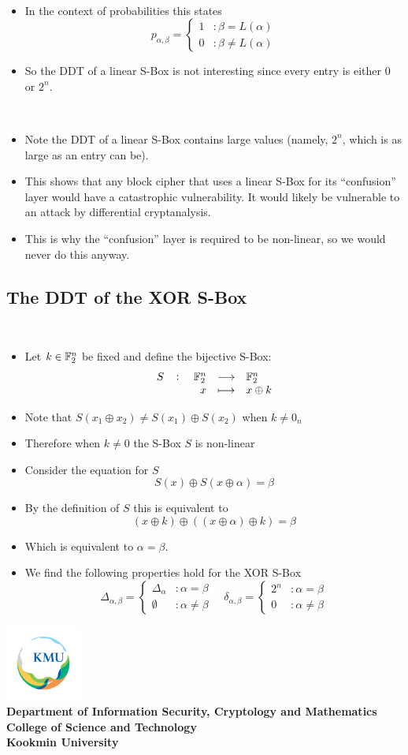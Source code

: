 \documentclass[11pt,openany]{article}
\newcommand{\footer}[1]{
\begin{flushright}
	\vspace{2em}
	\includegraphics[width=2.5cm]{school_logo.jpg} \\
	\vspace{1em}
	\textcolor{TealBlue2}{\small\textbf{#1}}
\end{flushright}
}
\begin{document}
\begin{remark}
\ \begin{itemize}
	\item In the context of probabilities this states \[
	p_{\alpha,\beta}=\begin{cases}
		1 &:\beta=L(\alpha)\\
		0 &:\beta\neq L(\alpha)
	\end{cases}
	\]
	\item So the DDT of a linear S-Box is not interesting since every entry is either $0$ or $2^n$.
\end{itemize}
\end{remark}

\begin{note}
\ \begin{itemize}
	\item Note the DDT of a linear S-Box contains large values (namely, $2^n$, which is as large as an entry can be).
	\item This shows that any block cipher that uses a linear S-Box for its ``confusion'' layer would have a catastrophic vulnerability. It would likely be vulnerable to an attack by differential cryptanalysis.
	\item This is why the ``confusion'' layer is required to be non-linear, so we would never do this anyway.
\end{itemize}
\end{note}

\newpage
\subsection{The DDT of the XOR S-Box}
\ \begin{itemize}
	\item Let $k\in\mathbb{F}_2^n$ be fixed and define the bijective S-Box: \[
	\fullfunction{S}{\F_2^n}{\F_2^n}{x}{x\oplus k}
	\]
	\item Note that $S(x_1\oplus x_2)\neq S(x_1)\oplus S(x_2)$ when $k\neq 0_n$
	\item Therefore when $k\neq 0$ the S-Box $S$ is non-linear
	\item Consider the equation for $S$ \[
	S(x)\oplus S(x\oplus \alpha) = \beta
	\]
	\item By the definition of $S$ this is equivalent to \[
	(x\oplus k)\oplus((x\oplus \alpha)\oplus k)=\beta
	\]
	\item Which is equivalent to $\alpha=\beta$.
	\item We find the following properties hold for the XOR S-Box \[
	\Delta_{\alpha,\beta}=\begin{cases}
		\Delta_\alpha &:\alpha=\beta \\
		\emptyset &:\alpha\neq\beta
	\end{cases}\quad \delta_{\alpha,\beta}=\begin{cases}
	2^n &:\alpha=\beta\\
	0 &:\alpha\neq\beta
\end{cases}
	\]
\end{itemize}


\footer{Department of Information Security, Cryptology and Mathematics\\
	College of Science and Technology\\
	Kookmin University}

\newpage

%
%
\end{document}
